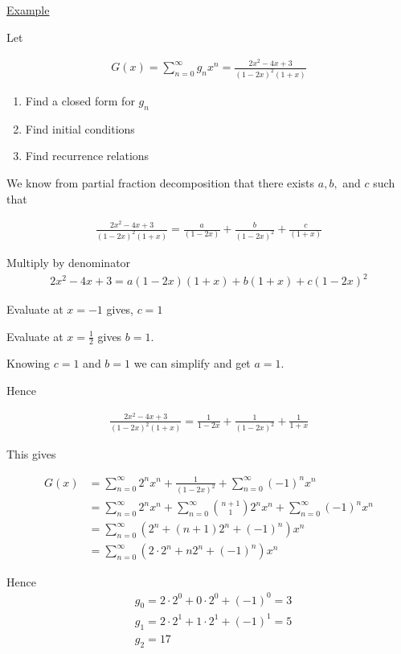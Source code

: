 \documentclass{article}
\begin{document}
\underline{Example}

Let

\begin{align*}
    G(x) = \sum_{n=0}^{\infty}g_nx^n = \frac{2x^2-4x+3}{(1-2x)^2(1+x)}
\end{align*}

\begin{enumerate}
    \item Find a closed form for $g_n$
    \item Find initial conditions
    \item Find recurrence relations
\end{enumerate}

We know from partial fraction decomposition that there exists $a,b,$ and $c$ such that

\begin{align*}
    \frac{2x^2-4x+3}{(1-2x)^2(1+x)} = \frac{a}{(1-2x)} + \frac{b}{(1-2x)^2} + \frac{c}{(1+x)}
\end{align*}

Multiply by denominator
\begin{align*}
    2x^2 - 4x + 3 = a(1-2x)(1+x) + b(1+x) + c(1-2x)^2
\end{align*}

Evaluate at $x=-1$ gives, $c=1$

Evaluate at $x= \frac{1}{2}$ gives $b = 1$.

Knowing $c=1$ and $b=1$ we can simplify and get $a=1$.

Hence

\begin{align*}
    \frac{2x^2-4x+3}{(1-2x)^2(1+x)} = \frac{1}{1-2x} + \frac{1}{(1-2x)^2} + \frac{1}{1+x}
\end{align*}

This gives

\begin{align*}
    G(x) &= \sum_{n=0}^{\infty}2^nx^n + \frac{1}{(1-2x)^2} + \sum_{n=0}^{\infty}(-1)^nx^n \\
    &= \sum_{n=0}^{\infty}2^nx^n + \sum_{n=0}^{\infty}\binom{n+1}{1}2^nx^n + \sum_{n=0}^{\infty}(-1)^nx^n \\
    &= \sum_{n=0}^{\infty}(2^n + (n+1)2^n + (-1)^n)x^n \\
    &= \sum_{n=0}^{\infty}(2 \cdot 2^n + n2^n + (-1)^n)x^n
\end{align*}

Hence 
\begin{align*}
    &g_0 = 2 \cdot 2^0 + 0 \cdot 2^0 + (-1)^0 = 3 \\ 
    &g_1 = 2 \cdot 2^1 + 1 \cdot 2^1 + (-1)^1 = 5 \\
    &g_2 = 17
\end{align*}
\end{document}
